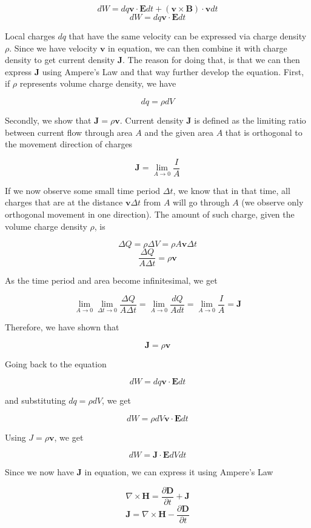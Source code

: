 \documentclass{article}
\begin{document}
\[ dW = dq\mathbf{v}\cdot\mathbf{E}dt + (\mathbf{v} \times \mathbf{B}) \cdot \mathbf{v}dt \]
\[ dW = dq\mathbf{v}\cdot\mathbf{E}dt \]

Local charges $dq$ that have the same velocity can be expressed via charge density $\rho$. Since we have velocity $\mathbf{v}$ in equation, we can then combine it with charge density to get current density $\mathbf{J}$. The reason for doing that, is that we can then express $\mathbf{J}$ using Ampere's Law and that way further develop the equation. First, if $\rho$ represents volume charge density, we have

\[ dq = \rho dV \]

Secondly, we show that $\mathbf{J} = \rho\mathbf{v}$. Current density $\mathbf{J}$ is defined as the limiting ratio between current flow through area $A$ and the given area $A$ that is orthogonal to the movement direction of charges

\[ \mathbf{J} = \lim_{A \to 0} \frac{I}{A} \]

If we now observe some small time period $\Delta t$, we know that in that time, all charges that are at the distance $\mathbf{v} \Delta t$ from $A$ will go through $A$ (we observe only orthogonal movement in one direction). The amount of such charge, given the volume charge density $\rho$, is

\[ \Delta Q = \rho \Delta V = \rho A \mathbf{v}\Delta t \]
\[ \frac{\Delta Q}{A \Delta t} = \rho\mathbf{v} \]

As the time period and area become infinitesimal, we get

\[ \lim_{A \to 0} \lim_{\Delta t \to 0} \frac{\Delta Q}{A \Delta t} = \lim_{A \to 0} \frac{dQ}{Adt} = \lim_{A \to 0} \frac{I}{A} = \mathbf{J} \]

Therefore, we have shown that

\[ \mathbf{J} = \rho\mathbf{v} \]

Going back to the equation

\[ dW = dq\mathbf{v}\cdot\mathbf{E}dt \]

and substituting $dq = \rho dV$, we get

\[ dW = \rho dV \mathbf{v}\cdot\mathbf{E}dt \]

Using $J = \rho \mathbf{v}$, we get

\[ dW = \mathbf{J} \cdot \mathbf{E} dVdt \]

Since we now have $\mathbf{J}$ in equation, we can express it using Ampere's Law

\[ \nabla \times \mathbf{H} = \frac{\partial\mathbf{D}}{\partial t} + \mathbf{J} \]
\[ \mathbf{J} = \nabla \times \mathbf{H} - \frac{\partial\mathbf{D}}{\partial t} \]
\end{document}
